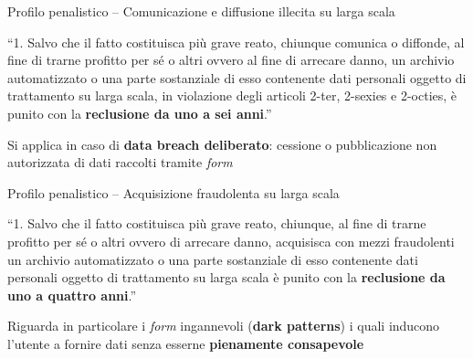 \documentclass[aspectratio=169]{beamer}
\begin{document}
\begin{frame}{Profilo penalistico -- Comunicazione e diffusione illecita su larga scala}

  \begin{normabox}
    \small
    ``1. Salvo che il fatto costituisca più grave reato, chiunque comunica o diffonde,
    al fine di trarne profitto per sé o altri ovvero al fine di arrecare danno, un
    archivio automatizzato o una parte sostanziale di esso contenente dati personali
    oggetto di trattamento su larga scala, in violazione degli articoli 2-ter, 2-sexies
    e 2-octies, è punito con la \textbf{reclusione da uno a sei anni}.''
  \end{normabox}

  \vspace{0.3cm}
  Si applica in caso di \textbf{data breach deliberato}: cessione o pubblicazione non autorizzata di dati raccolti tramite \emph{form}


\end{frame}

\begin{frame}{Profilo penalistico -- Acquisizione fraudolenta su larga scala}

  \begin{normabox}
    \small
    ``1. Salvo che il fatto costituisca più grave reato, chiunque, al fine di trarne
    profitto per sé o altri ovvero di arrecare danno, acquisisca con mezzi
    fraudolenti un archivio automatizzato o una parte sostanziale di esso contenente
    dati personali oggetto di trattamento su larga scala è punito con la \textbf{reclusione
    da uno a quattro anni}.''
  \end{normabox}

  \vspace{0.3cm}
  Riguarda in particolare i \emph{form} ingannevoli (\textbf{dark patterns}) i quali inducono l'utente a fornire dati senza esserne \textbf{pienamente consapevole}

\end{frame}
\end{document}
